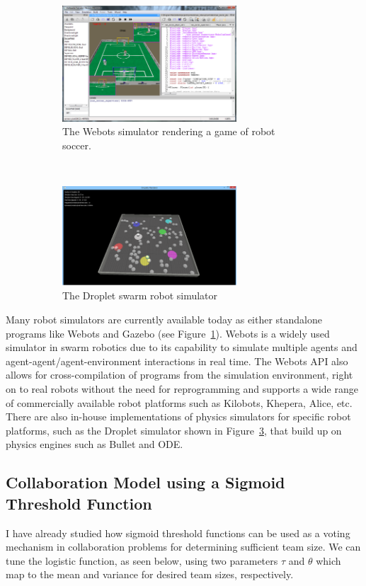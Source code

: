 \documentclass[11pt, onecolumn, compsoc, letterpaper]{article}
\begin{document}
\begin{figure}[!tb]
\begin{subfigure}{.5\textwidth}
\centering\includegraphics[width=6.5cm]{../assets/Webots.png}
\centering\caption{The Webots simulator rendering a game of robot soccer.\footnotemark}\label{fig:gazebo}
\end{subfigure}~
\begin{subfigure}{.5\textwidth}
\centering\includegraphics[width=6.5cm]{../assets/dsim.png}
\centering\caption{The Droplet swarm robot simulator}\label{fig:dropletsim}
\end{subfigure}
\caption{}
\end{figure}

Many robot simulators are currently available today as either standalone programs like Webots and Gazebo (see Figure~\ref{fig:gazebo}). Webots is a widely used simulator in swarm robotics due to its capability to simulate multiple agents and agent-agent/agent-environment interactions in real time. The Webots API also allows for cross-compilation of programs from the simulation environment, right on to real robots without the need for reprogramming and supports a wide range of commercially available robot platforms such as Kilobots, Khepera, Alice, etc. There are also in-house implementations of physics simulators for specific robot platforms, such as the Droplet simulator shown in Figure~\ref{fig:dropletsim}, that build up on physics engines such as Bullet and ODE.

\subsection{Collaboration Model using a Sigmoid Threshold Function}
I have already studied how sigmoid threshold functions can be used as a voting mechanism in collaboration problems for determining sufficient team size. We can tune the logistic function, as seen below, using two parameters $\tau$ and $\theta$ which map to the mean and variance for desired team sizes, respectively.
\end{document}
